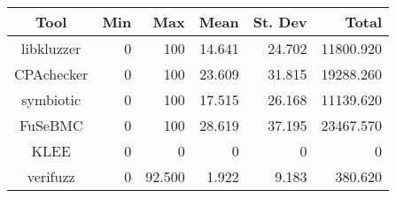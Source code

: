 \begin{table}
	\begin{center}
		\begin{tabular}{|c|r|r|r|r|r|}
			\hline
			Tool & Min & Max & Mean & St. Dev & Total \\
			\hline
			libkluzzer & 0 & 100 & 14.641 & 24.702 & 11800.920 \\
			\hline
			CPAchecker & 0 & 100 & 23.609 & 31.815 & 19288.260 \\
			\hline
			symbiotic & 0 & 100 & 17.515 & 26.168 & 11139.620 \\
			\hline
			FuSeBMC & 0 & 100 & 28.619 & 37.195 & 23467.570 \\
			\hline
			KLEE & 0 & 0 & 0 & 0 & 0 \\
			\hline
			verifuzz & 0 & 92.500 & 1.922 & 9.183 & 380.620 \\
			\hline
		\end{tabular}
	\end{center}
\end{table}